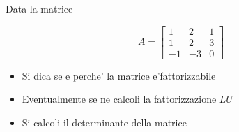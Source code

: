 \noindent Data la matrice

\bigskip
\[
A=\left[
\begin{array}{ccc}
1 & 2 & 1 \\
1 & 2 & 3\\
-1 & -3 & 0
\end{array}\right]
\]


\begin{itemize}
\item Si dica se e perche' la matrice e'fattorizzabile
\item Eventualmente se ne calcoli la
fattorizzazione $LU$
\item Si calcoli il determinante della matrice


\end{itemize}
